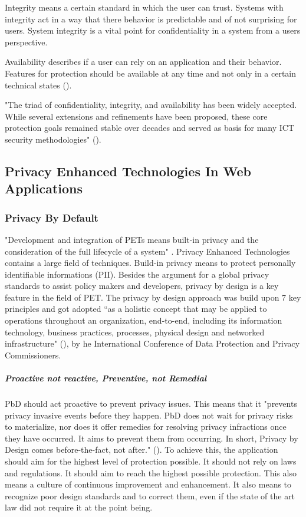 Integrity means a certain standard in which the user can trust. Systems with integrity act in a way that there behavior is predictable and of not surprising for users. System integrity is a vital point for confidentiality in a system from a users perspective.

Availability describes if a user can rely on an application and their behavior. Features for protection should be available at any time and not only in a certain technical states (\cite{zwingelberg2012privacy}).

"The triad of confidentiality, integrity, and availability has been widely accepted. While several extensions and refinements have been proposed, these core protection goals remained stable over decades and served as basis for many ICT security methodologies" (\cite{danezis2015privacy}).

\subsection{Privacy Enhanced Technologies In Web Applications}

\subsubsection{Privacy By Default}
"Development and integration of PETs means built-in privacy and the consideration of the full lifecycle of a system" \cite{danezis2015privacy}. Privacy Enhanced Technologies contains a large field of techniques. Build-in privacy means to protect personally identifiable informations (PII). Besides the argument for a global privacy standards to assist policy makers and developers, privacy by design is a key feature in the field of PET. The privacy by design approach was build upon 7 key principles and got adopted “as a holistic concept that may be applied to operations throughout an organization, end-to-end, including its information technology, business practices, processes, physical design and networked infrastructure" (\cite{danezis2015privacy}), by he International Conference of Data Protection and Privacy Commissioners.


\subparagraph{Proactive not reactive, Preventive, not Remedial} 
PbD should act proactive to prevent privacy issues. This means that it "prevents privacy invasive events before they happen. PbD does not wait for privacy risks to materialize, nor does it offer remedies for resolving privacy infractions once they have occurred. It aims to prevent them from occurring. In short, Privacy by Design comes before-the-fact, not after." (\cite{cavoukian2009privacy}). To achieve this, the application should aim for the highest level of protection possible. It should not rely on laws and regulations. It should aim to reach the highest possible protection. This also means a culture of continuous improvement and enhancement. It also means to recognize poor design standards and to correct them, even if the state of the art law did not require it at the point being.

